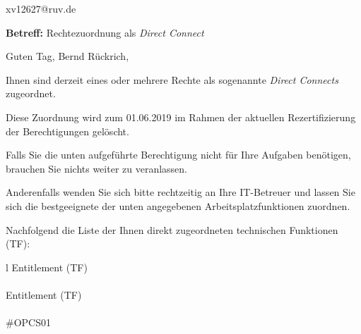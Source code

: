 \documentclass[a4paper,landscape,12pt]{letter}
\begin{document}
\begin{letter}{xv12627@ruv.de\hfill \break}
\begin{normalsize}
	\opening{\textbf{Betreff:} Rechtezuordnung als \emph{Direct Connect}}
	\begin{normalsize} \hfill
	\end{normalsize}

	\begin{normalsize}
		Guten Tag, 
	Bernd Rückrich, \hfill \break
	\end{normalsize}
	\end{normalsize}
	
\begin{normalsize}
	Ihnen sind derzeit eines oder mehrere Rechte als sogenannte \emph{Direct Connects} zugeordnet.
	
	Diese Zuordnung wird zum 01.06.2019 im Rahmen der aktuellen Rezertifizierung der Berechtigungen gelöscht.
	
	Falls Sie die unten aufgeführte Berechtigung nicht für Ihre Aufgaben benötigen, 
	brauchen Sie nichts weiter zu veranlassen.
	
	Anderenfalls wenden Sie sich bitte rechtzeitig an Ihre IT-Betreuer 
	und lassen Sie sich die bestgeeignete der unten angegebenen Arbeitsplatzfunktionen zuordnen.
	\end{normalsize}
	
\begin{normalsize}
	Nachfolgend die Liste der Ihnen direkt zugeordneten technischen Funktionen (TF):

	\begin{longtable}{l}
		Entitlement (TF) \\ \hline
		\endfirsthead
		\\\hline
		Entitlement (TF) \\ \hline
		\endhead %
		\multicolumn{1}{r@{}}{Fortsetzung \ldots}\\
		\endfoot
		\hline
		\endlastfoot
	\#OPCS01\\
	\end{longtable}
	\end{normalsize}
	

\end{letter}
\end{document}
